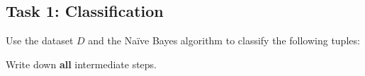 \documentclass[
english,
smallborders
]{i6prcsht}
\begin{document}
\subsection*{Task 1: Classification}


Use the dataset $D$ and the Naïve Bayes algorithm to classify the following tuples:

\begin{center}	
\end{center}


Write down \textbf{all} intermediate steps.
\end{document}
